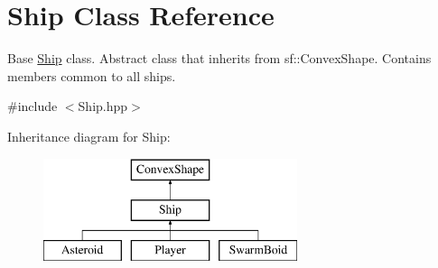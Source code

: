 \hypertarget{class_ship}{}\section{Ship Class Reference}
\label{class_ship}


Base \hyperlink{class_ship}{Ship} class. Abstract class that inherits from sf\+::\+Convex\+Shape. Contains members common to all ships.  




{\ttfamily \#include $<$Ship.\+hpp$>$}

Inheritance diagram for Ship\+:\begin{figure}[H]
\begin{center}
\leavevmode
\includegraphics[height=3.000000cm]{class_ship}
\end{center}
\end{figure}
